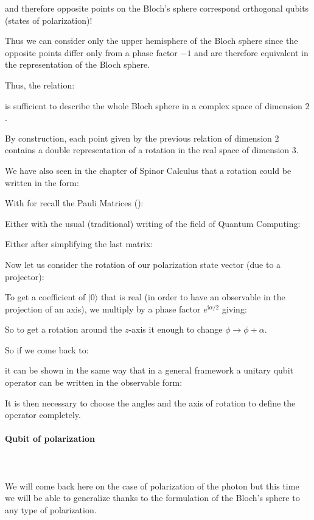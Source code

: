 	and therefore opposite points on the Bloch's sphere correspond orthogonal qubits (states of polarization)!

	Thus we can consider only the upper hemisphere of the Bloch sphere since the opposite points differ only from a phase factor $-1$ and are therefore equivalent in the representation of the Bloch sphere.

	Thus, the relation:
	
	is sufficient to describe the whole Bloch sphere in a complex space of dimension $2$.

	By construction, each point given by the previous relation of dimension $2$ contains a double representation of a rotation in the real space of dimension $3$.

	We have also seen in the chapter of Spinor Calculus that a rotation could be written in the form:
	
	With for recall the Pauli Matrices ():
	
	Either with the usual (traditional) writing of the field of Quantum Computing:
	
	Either after simplifying the last matrix:
	
	Now let us consider the rotation of our polarization state vector (due to a projector):
	
	To get a coefficient of $|0\rangle$ that is real (in order to have an observable in the projection of an axis), we multiply by a phase factor $e^{\mathrm{i}\alpha/2}$ giving:
	
	So to get a rotation around the $z$-axis it enough to change $\phi\rightarrow \phi+\alpha$.

	So if we come back to:
	
	it can be shown in the same way that in a general framework a unitary qubit operator can be written in the observable form:
	
	It is then necessary to choose the angles and the axis of rotation to define the operator completely.
	
	\paragraph{Qubit of polarization}\mbox{}\\\\
	We will come back here on the case of polarization of the photon but this time we will be able to generalize thanks to the formulation of the Bloch's sphere to any type of polarization.


